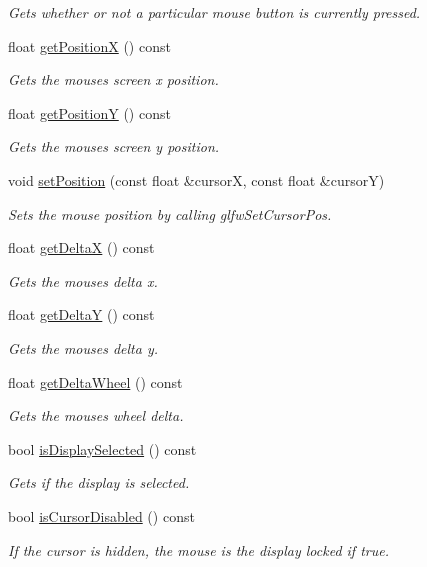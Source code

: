 \begin{DoxyCompactItemize}
\begin{DoxyCompactList}\small\item\em Gets whether or not a particular mouse button is currently pressed. \end{DoxyCompactList}\item 
float \hyperlink{classflounder_1_1mouse_a08bea9df62055e5e810be78364dab057}{get\+PositionX} () const
\begin{DoxyCompactList}\small\item\em Gets the mouses screen x position. \end{DoxyCompactList}\item 
float \hyperlink{classflounder_1_1mouse_a2c3c2c739ac356bfdc10b05bf8ad526a}{get\+PositionY} () const
\begin{DoxyCompactList}\small\item\em Gets the mouses screen y position. \end{DoxyCompactList}\item 
void \hyperlink{classflounder_1_1mouse_a8b79257481a09d821cc0dd52a2729d5f}{set\+Position} (const float \&cursorX, const float \&cursorY)
\begin{DoxyCompactList}\small\item\em Sets the mouse position by calling glfw\+Set\+Cursor\+Pos. \end{DoxyCompactList}\item 
float \hyperlink{classflounder_1_1mouse_aafbbd955e1d66c0b4566f0806969bbf0}{get\+DeltaX} () const
\begin{DoxyCompactList}\small\item\em Gets the mouses delta x. \end{DoxyCompactList}\item 
float \hyperlink{classflounder_1_1mouse_a083d7f7e024ed2cca257f353603180f6}{get\+DeltaY} () const
\begin{DoxyCompactList}\small\item\em Gets the mouses delta y. \end{DoxyCompactList}\item 
float \hyperlink{classflounder_1_1mouse_a0c18d701167fb2a1f0b17e490cfffcd9}{get\+Delta\+Wheel} () const
\begin{DoxyCompactList}\small\item\em Gets the mouses wheel delta. \end{DoxyCompactList}\item 
bool \hyperlink{classflounder_1_1mouse_ade2f260576e6fa3122664ef83422722a}{is\+Display\+Selected} () const
\begin{DoxyCompactList}\small\item\em Gets if the display is selected. \end{DoxyCompactList}\item 
bool \hyperlink{classflounder_1_1mouse_a21ab748aa15cd2b0c565bac54e4aa013}{is\+Cursor\+Disabled} () const
\begin{DoxyCompactList}\small\item\em If the cursor is hidden, the mouse is the display locked if true. \end{DoxyCompactList}\end{DoxyCompactItemize}

